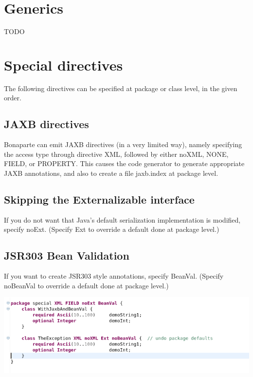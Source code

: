 \documentclass[11pt,a4paper,oneside]{article}
\begin{document}
\section{Generics}
TODO

\section{Special directives}
The following directives can be specified at package or class level, in the given order. 
\subsection{JAXB directives}
Bonaparte can emit JAXB directives (in a very limited way), namely specifying the access type through directive {\ttfamily XML}, followed
by either {\ttfamily noXML}, {\ttfamily NONE}, {\ttfamily FIELD}, or {\ttfamily PROPERTY}. This causes the code generator to generate
appropriate JAXB annotations, and also to create a file {\ttfamily jaxb.index} at package level.
 

\subsection{Skipping the {\ttfamily Externalizable} interface}
If you do not want that Java's default serialization implementation is modified, specify {\ttfamily noExt}. (Specify {\ttfamily Ext} to
override a default done at package level.)

\subsection{JSR303 Bean Validation}
If you want to create JSR303 style annotations, specify {\ttfamily BeanVal}. (Specify {\ttfamily noBeanVal} to
override a default done at package level.)

\vspace{2mm}

\hspace{1cm}\includegraphics[scale=0.5]{images/tut1-012-special.png}
\end{document}
